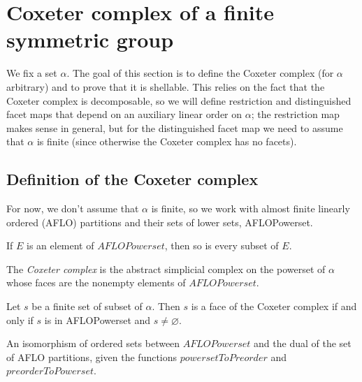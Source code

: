 \section{Coxeter complex of a finite symmetric group}

We fix a set $\alpha$. The goal of this section is to define the Coxeter complex (for $\alpha$ arbitrary) and to prove that it is shellable.
This relies on the fact that the Coxeter complex is decomposable, so we will define restriction and distinguished facet maps that depend on
an auxiliary linear order on $\alpha$; the restriction map makes sense in general, but for the distinguished facet map we need to assume that
$\alpha$ is finite (since otherwise the Coxeter complex has no facets).

\subsection{Definition of the Coxeter complex}

For now, we don't assume that $\alpha$ is finite, so we work with almost finite linearly ordered (AFLO) partitions and
their sets of lower sets, AFLOPowerset.

\begin{sublemma}
If $E$ is an element of $AFLOPowerset$, then so is every subset of $E$.

\end{sublemma}

\begin{subdefi}[CoxeterComplex]
The \emph{Coxeter complex} is the abstract simplicial complex on the powerset of $\alpha$ whose faces are the nonempty elements of $AFLOPowerset$.

\end{subdefi}

\begin{sublemma}[FacesCoxeterComplex]
Let $s$ be a finite set of subset of $\alpha$. Then $s$ is a face of the Coxeter complex if and only if $s$ is in AFLOPowerset and $s\ne\varnothing$.

\end{sublemma}

\begin{subdefi}[CoxeterComplextoPartitions]
An isomorphism of ordered sets between $AFLOPowerset$ and the dual of the set of AFLO partitions, given the functions $powersetToPreorder$ and $preorderToPowerset$.


\end{subdefi}

